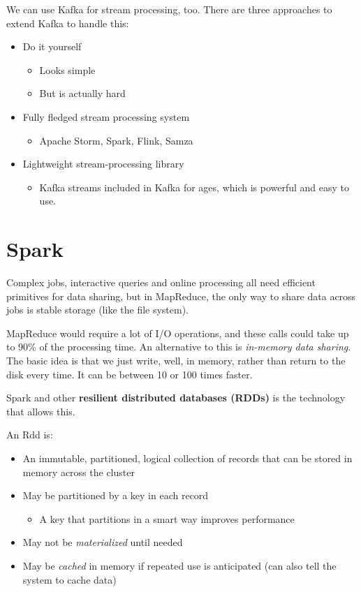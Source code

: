 \documentclass[11pt,a4paper,titlepage,dvipsnames,cmyk]{scrartcl}
\begin{document}
We can use Kafka for stream processing, too. There are three approaches to extend Kafka to handle this:
\begin{itemize}
    \item Do it yourself
    \begin{itemize}
        \item Looks simple
        \item But is actually hard
    \end{itemize}
    \item Fully fledged stream processing system
    \begin{itemize}
        \item Apache Storm, Spark, Flink, Samza
    \end{itemize}
    \item Lightweight stream-processing library
    \begin{itemize}
        \item Kafka streams included in Kafka for ages, which is powerful and easy to use.
    \end{itemize}
\end{itemize}

\section{Spark}
Complex jobs, interactive queries and online processing all need efficient primitives for data sharing, but in MapReduce, the only way to share data across jobs is stable storage (like the file system).

MapReduce would require a lot of I/O operations, and these calls could take up to 90\% of the processing time. An alternative to this is \textit{in-memory data sharing}. The basic idea is that we just write, well, in memory, rather than return to the disk every time. It can be between 10 or 100 times faster.

Spark and other \textbf{resilient distributed databases (RDDs)} is the technology that allows this.

\begin{tcolorbox} [space to upper,
collower=white,
title={RDD},
nobeforeafter,
halign lower=flush right, ]
An Rdd is:
\begin{itemize}
    \item An immutable, partitioned, logical collection of records that can be stored in memory across the cluster
    \item May be partitioned by a key in each record
    \begin{itemize}
        \item A key that partitions in a smart way improves performance
    \end{itemize}
    \item May not be \textit{materialized} until needed
    \item May be \textit{cached} in memory if repeated use is anticipated (can also tell the system to cache data)
\end{itemize}
\end{tcolorbox}
\end{document}
